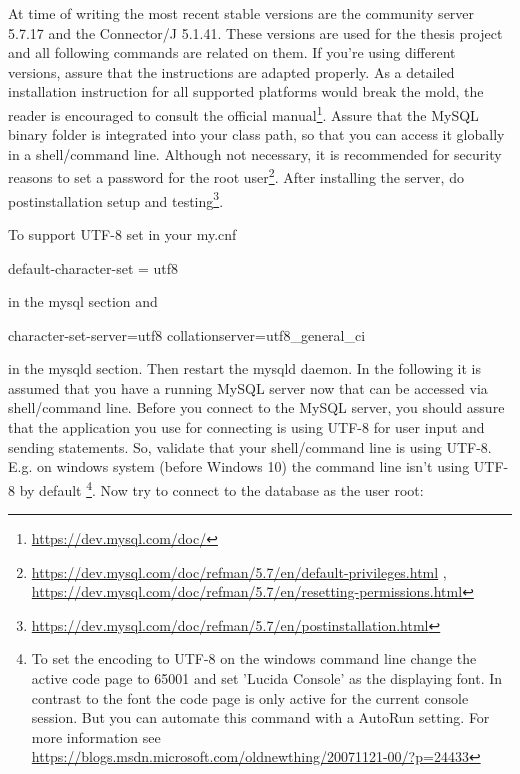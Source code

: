 At time of writing the most recent stable versions are the community server 5.7.17 and the Connector/J 5.1.41. These versions are used for the thesis project and all following commands are related on them. If you're using 
different versions, assure that the instructions are adapted properly. As a detailed installation instruction for all supported platforms would break the mold, the reader is encouraged to consult the official 
manual\footnote{\url{https://dev.mysql.com/doc/}}. 
Assure that the MySQL binary folder is integrated into your class path, so that you can access it globally in a shell/command line. Although not necessary, it is recommended for security reasons 
to set a password for the root user\footnote{\url{https://dev.mysql.com/doc/refman/5.7/en/default-privileges.html} , \url{https://dev.mysql.com/doc/refman/5.7/en/resetting-permissions.html}}. 
After installing the server, do postinstallation setup and testing\footnote{\url{https://dev.mysql.com/doc/refman/5.7/en/postinstallation.html}}. 

To support UTF-8 set in your my.cnf 

\begin{codebox}
	default-character-set = utf8
\end{codebox}

in the mysql section and

\begin{codebox}
	character-set-server=utf8\newline
	collation\-server=utf8\_general\_ci
\end{codebox}

in the mysqld section. Then restart the mysqld daemon. In the following it is assumed that you have a running MySQL server now that can be accessed via shell/command line. Before you connect to the MySQL server, you should assure that the application you use for connecting is using UTF-8 for user input and sending statements. So, validate that your shell/command line is using UTF-8. E.g. on windows system (before Windows 10) the command line isn't using UTF-8 by default
\footnote{To set the encoding to UTF-8 on the windows command line change the active code page to 65001 and set 'Lucida Console' as the displaying font. In contrast to the font the code page is only active for the current console session. But you can automate this command with a AutoRun setting. For more information see \url{https://blogs.msdn.microsoft.com/oldnewthing/20071121-00/?p=24433}}.  
Now try to connect to the database as the user root:

